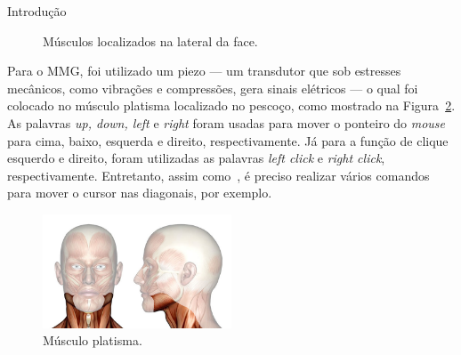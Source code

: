 \begin{chapter}{Introdução}
\begin{figure}
	\centering
	\quad
	\caption{Músculos localizados na lateral da face.}
	\label{fig:test}
\end{figure}

\break
Para o MMG, foi utilizado um piezo --- um transdutor que sob estresses
mecânicos, como vibrações e compressões, gera sinais elétricos --- o qual foi
colocado no músculo platisma localizado no pescoço, como mostrado na
Figura~\ref{fig:platisma}. As palavras \textit{up, down, left} e \textit{right}
foram usadas para mover o ponteiro do \textit{mouse} para cima, baixo, esquerda
e direito, respectivamente. Já para a função de clique esquerdo e direito, foram
utilizadas as palavras \textit{left click} e \textit{right click},
respectivamente. Entretanto, assim como~\cite{Karimullah02}, é preciso realizar
vários comandos para mover o cursor nas diagonais, por exemplo.
\begin{figure}[!h]
	\centering
	\includegraphics[width=0.5\textwidth]{fig/platisma}
	\caption{Músculo platisma.}
	\label{fig:platisma}
\end{figure}


\end{chapter}
